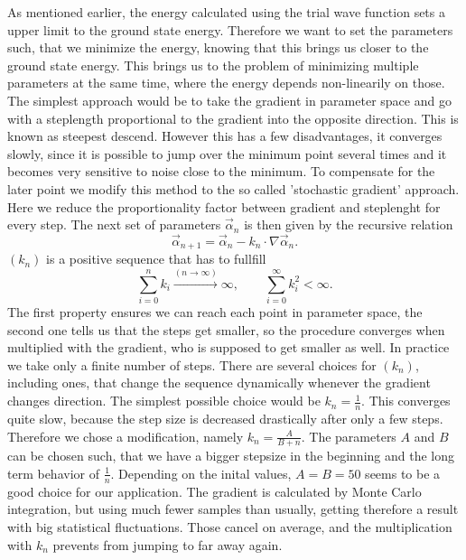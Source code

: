 \documentclass[a4paper,10pt]{article}
\begin{document}
As mentioned earlier, the energy calculated using the trial wave function sets a upper limit to the ground state energy.
Therefore we want to set the parameters such, that we minimize the energy, knowing that this brings us closer to the ground state energy. 
This brings us to the problem of minimizing multiple parameters at the same time, where the energy depends non-linearily on those.
The simplest approach would be to take the gradient in parameter space and go with a steplength proportional to 
the gradient into the opposite direction. This is known as steepest descend. However this has a few disadvantages, it converges slowly, since it is possible 
to jump over the minimum point several times and it becomes very sensitive to noise close to the minimum. 
To compensate for the later point we modify this method to the so called 'stochastic gradient' approach. 
Here we reduce the proportionality factor between gradient and steplenght for every step.
The next set of parameters $\vec{\alpha}_n$ is then given by the recursive relation
\begin{equation}
 \vec{\alpha}_{n+1} = \vec{\alpha}_n - k_n\cdot \nabla \vec{\alpha}_n.
\end{equation}
$(k_n)$ is a positive sequence that has to fullfill
\begin{equation}
 \sum_{i=0}^n k_i \stackrel{(n \rightarrow \infty)}{\longrightarrow} \infty , \quad\quad \sum_{i=0}^{\infty} k_i^2 < \infty.
\end{equation}
The first property ensures we can reach each point in parameter space, the second one tells us that the steps get smaller, so the procedure converges
when multiplied with the gradient, who is supposed to get smaller as well. 
In practice we take only a finite number of steps. There are several choices for $(k_n)$, including ones, that change the sequence dynamically whenever the gradient changes 
direction. 
The simplest possible choice would be $k_n=\frac{1}{n}$.
This converges quite slow, because the step size is decreased drastically after only a few steps. 
Therefore we chose a modification, namely $k_n=\frac{A}{B+n}$. The parameters $A$ and $B$ can be chosen such,
that we have a bigger stepsize in the beginning and the long term behavior of $\frac1n$. Depending on the inital values,
$A=B=50$ seems to be a good choice for our application. 
The gradient is calculated by Monte Carlo integration, but using much fewer samples than usually, getting therefore a result with big statistical fluctuations. 
Those  cancel on average, and the multiplication with $k_n$ prevents from jumping to far away again. 
\end{document}
